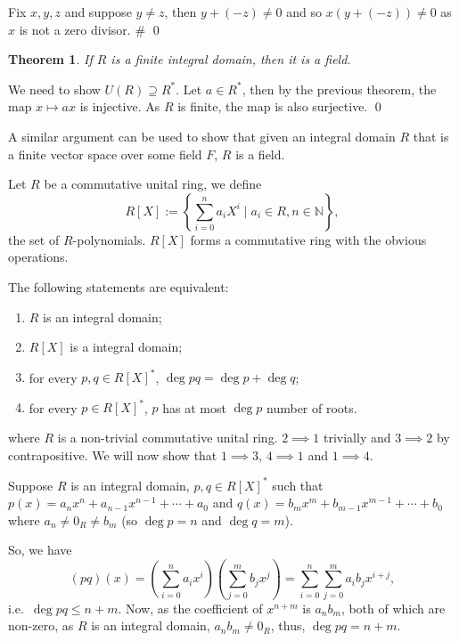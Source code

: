 \documentclass[
]{article}
\newtheorem{theorem}{Theorem}
\begin{document}
Fix \(x, y, z\) and suppose \(y \neq z\), then \(y + (-z) \neq 0\) and
so \(x (y + (-z)) \neq 0\) as \(x\) is not a zero divisor. \# \qed

\begin{theorem}
  If \(R\) is a finite integral domain, then it is a field.
\end{theorem}
\proof

We need to show \(U(R) \supseteq R^*\). Let \(a \in R^*\), then by the
previous theorem, the map \(x \mapsto ax\) is injective. As \(R\) is
finite, the map is also surjective. \qed

A similar argument can be used to show that given an integral domain
\(R\) that is a finite vector space over some field \(F\), \(R\) is a
field.

Let \(R\) be a commutative unital ring, we define \[
  R[X] := \left\{ \sum_{i = 0}^n a_i X^i \mid a_i \in R, n \in \mathbb{N} \right\},
\] the set of \(R\)-polynomials. \(R[X]\) forms a commutative ring with
the obvious operations.

The following statements are equivalent:

\begin{enumerate} 
  \item \(R\) is an integral domain;
  \item \(R[X]\) is a integral domain;
  \item for every \(p, q \in R[X]^*\), \(\deg pq = \deg p + \deg q\);
  \item for every \(p \in R[X]^*\), \(p\) has at most \(\deg p\) number of roots.
\end{enumerate}

where \(R\) is a non-trivial commutative unital ring. \proof
\(2 \implies 1\) trivially and \(3 \implies 2\) by contrapositive. We
will now show that \(1 \implies 3\), \(4 \implies 1\) and
\(1 \implies 4\).

Suppose \(R\) is an integral domain, \(p, q \in R[X]^*\) such that
\(p(x) = a_n x^n + a_{n - 1} x^{n - 1} + \cdots + a_0\) and
\(q(x) = b_m x^m + b_{m - 1} x^{m - 1} + \cdots + b_0\) where
\(a_n \neq 0_R \neq b_m\) (so \(\deg p = n\) and \(\deg q = m\)).

So, we have \[(pq)(x) = \left(\sum_{i = 0}^n a_i x^i\right) 
              \left(\sum_{j = 0}^m b_j x^j\right)
            = \sum_{i = 0}^n \sum_{j = 0}^m a_i b_j x^{i + j},\]
i.e.~\(\deg pq \le n + m\). Now, as the coefficient of \(x^{n + m}\) is
\(a_n b_m\), both of which are non-zero, as \(R\) is an integral domain,
\(a_n b_m \neq 0_R\), thus, \(\deg pq = n + m\).
\end{document}
